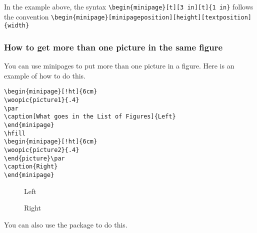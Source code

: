 In the example above, the syntax \verb|\begin{minipage}[t][3 in][t]{1 in}| follows the convention \linebreak\verb|\begin{minipage}[minipageposition][height][textposition]{width}|

\subsubsection[Two pictures in one figure]{How to get more than one picture in the same figure}

You can use minipages to put more than one picture in a figure. Here is an example of how to do this.
\begin{singlespace}\small
\begin{verbatim}
\begin{minipage}[!ht]{6cm}
\woopic{picture1}{.4}
\par
\caption[What goes in the List of Figures]{Left}
\end{minipage}
\hfill
\begin{minipage}[!ht]{6cm}
\woopic{picture2}{.4}
\end{picture}\par
\caption{Right}
\end{minipage}
\end{verbatim}
\end{singlespace}
\begin{figure}[!ht]
\begin{minipage}[!ht]{6cm}
\par
\caption[What goes in the List of Figures]{Left}
\end{minipage}
\hfill
\begin{minipage}[!ht]{6cm}
\par
\caption{Right}
\end{minipage}
\end{figure}

You can also use the  package to do this. %

